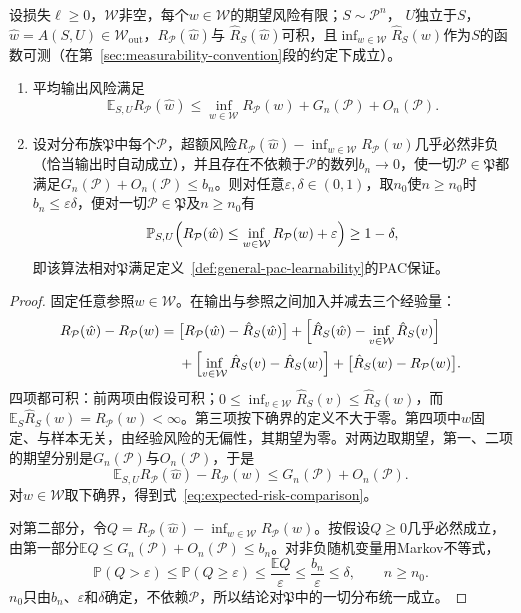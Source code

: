\begin{theorem}[期望风险比较]
\label{thm:expected-risk-comparison}
设损失$\ell\geq0$，$\mathcal W$非空，每个$w\in\mathcal W$的期望风险有限；$S\sim\mathcal P^n$，
$U$独立于$S$，$\hat w=A(S,U)\in\mathcal W_{\mathrm{out}}$，$R_{\mathcal P}(\hat w)$与
$\hat R_S(\hat w)$可积，且$\inf_{w\in\mathcal W}\hat R_S(w)$作为$S$的函数可测（在第~\ref{sec:measurability-convention}段的约定下成立）。
\begin{enumerate}
 \item 平均输出风险满足
 \begin{equation}
  \mathbb E_{S,U}R_{\mathcal P}(\hat w)
  \leq\inf_{w\in\mathcal W}R_{\mathcal P}(w)+G_n(\mathcal P)+O_n(\mathcal P).
  \label{eq:expected-risk-comparison}
 \end{equation}
 \item 设对分布族$\mathfrak P$中每个$\mathcal P$，超额风险$R_{\mathcal P}(\hat w)-\inf_{w\in\mathcal W}R_{\mathcal P}(w)$几乎必然非负（恰当输出时自动成立），并且存在不依赖于$\mathcal P$的数列$b_n\to0$，使一切$\mathcal P\in\mathfrak P$都满足$G_n(\mathcal P)+O_n(\mathcal P)\leq b_n$。则对任意$\varepsilon,\delta\in(0,1)$，取$n_0$使$n\geq n_0$时$b_n\leq\varepsilon\delta$，便对一切$\mathcal P\in\mathfrak P$及$n\geq n_0$有
 \[
  \mathbb P_{S,U}\Bigl(R_{\mathcal P}(\hat w)\leq\inf_{w\in\mathcal W}R_{\mathcal P}(w)+\varepsilon\Bigr)\geq1-\delta,
 \]
 即该算法相对$\mathfrak P$满足定义~\ref{def:general-pac-learnability}的PAC保证。
\end{enumerate}
\end{theorem}

\begin{proof}
固定任意参照$w\in\mathcal W$。在输出与参照之间加入并减去三个经验量：
\[
 \begin{aligned}
 R_{\mathcal P}(\hat w)-R_{\mathcal P}(w)
 ={}&\bigl[R_{\mathcal P}(\hat w)-\hat R_S(\hat w)\bigr]
   +\Bigl[\hat R_S(\hat w)-\inf_{v\in\mathcal W}\hat R_S(v)\Bigr]\\
 &+\Bigl[\inf_{v\in\mathcal W}\hat R_S(v)-\hat R_S(w)\Bigr]
   +\bigl[\hat R_S(w)-R_{\mathcal P}(w)\bigr].
 \end{aligned}
\]
四项都可积：前两项由假设可积；$0\leq\inf_{v\in\mathcal W}\hat R_S(v)\leq\hat R_S(w)$，而$\mathbb E_S\hat R_S(w)=R_{\mathcal P}(w)<\infty$。第三项按下确界的定义不大于零。第四项中$w$固定、与样本无关，由经验风险的无偏性，其期望为零。对两边取期望，第一、二项的期望分别是$G_n(\mathcal P)$与$O_n(\mathcal P)$，于是
\[
 \mathbb E_{S,U}R_{\mathcal P}(\hat w)-R_{\mathcal P}(w)\leq G_n(\mathcal P)+O_n(\mathcal P).
\]
对$w\in\mathcal W$取下确界，得到式~\eqref{eq:expected-risk-comparison}。

对第二部分，令$Q=R_{\mathcal P}(\hat w)-\inf_{w\in\mathcal W}R_{\mathcal P}(w)$。按假设$Q\geq0$几乎必然成立，由第一部分$\mathbb EQ\leq G_n(\mathcal P)+O_n(\mathcal P)\leq b_n$。对非负随机变量用Markov不等式，
\[
 \mathbb P(Q>\varepsilon)\leq\mathbb P(Q\geq\varepsilon)\leq\frac{\mathbb EQ}{\varepsilon}\leq\frac{b_n}{\varepsilon}\leq\delta,
 \qquad n\geq n_0.
\]
$n_0$只由$b_n$、$\varepsilon$和$\delta$确定，不依赖$\mathcal P$，所以结论对$\mathfrak P$中的一切分布统一成立。
\end{proof}

